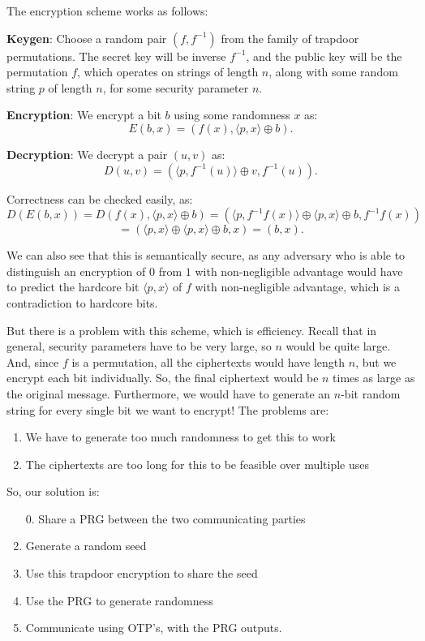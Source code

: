 \documentclass[11pt]{article}
\newcommand{\tb}{\textbf}
\begin{document}
The encryption scheme works as follows:\medskip

\textbf{Keygen}: Choose a random pair \((f,f^{-1})\) from the family of trapdoor permutations.
The secret key will be inverse \(f^{-1}\), and the public key will be the permutation \(f\), which operates on strings of length \(n\),
along with some random string \(p\) of length \(n\), for some security parameter \(n\).\smallskip

\textbf{Encryption}: We encrypt a bit \(b\) using some randomness \(x\) as:
\[E(b,x) = (f(x), \langle p,x\rangle\oplus b).\]

\tb{Decryption}: We decrypt a pair \((u,v)\) as:
\[D(u,v) = \left(\langle p, f^{-1}(u)\rangle\oplus v,f^{-1}(u)\right).\]

Correctness can be checked easily, as:
\[D(E(b,x)) = D(f(x), \langle p,x\rangle\oplus b) = \left(\langle p, f^{-1}f(x)\rangle\oplus \langle p,x\rangle\oplus b, f^{-1}f(x)\right)\]
\[ = \left(\langle p,x\rangle\oplus\langle p,x\rangle\oplus b, x\right) = (b,x).\]

We can also see that this is semantically secure, as any adversary who is able to distinguish an encryption of \(0\) from \(1\)
with non-negligible advantage would have to predict the hardcore bit \(\langle p, x\rangle\) of \(f\) with non-negligible advantage,
which is a contradiction to hardcore bits.\bigskip

But there is a problem with this scheme, which is efficiency.
Recall that in general, security parameters have to be very large, so \(n\) would be quite large.
And, since \(f\) is a permutation, all the ciphertexts would have length \(n\),
but we encrypt each bit individually.
So, the final ciphertext would be \(n\) times as large as the original message.
Furthermore, we would have to generate an \(n\)-bit random string for every single bit we want to encrypt!
The problems are:\medskip

\begin{enumerate}
\item We have to generate too much randomness to get this to work
\item The ciphertexts are too long for this to be feasible over multiple uses
\end{enumerate}

So, our solution is:
\begin{enumerate}
\item [0.] Share a PRG between the two communicating parties
\item Generate a random seed
\item Use this trapdoor encryption to share the seed
\item Use the PRG to generate randomness
\item Communicate using OTP's, with the PRG outputs.
\end{enumerate}
\end{document}
